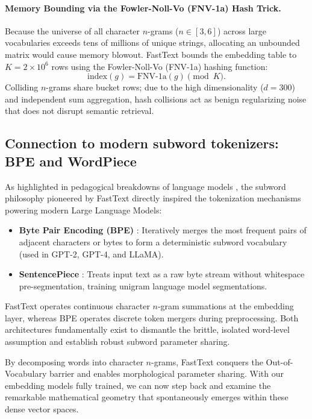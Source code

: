 \documentclass[../../main.tex]{subfiles}
\begin{document}
\paragraph{Memory Bounding via the Fowler-Noll-Vo (FNV-1a) Hash Trick.}
Because the universe of all character $n$-grams ($n \in [3, 6]$) across large vocabularies exceeds tens of millions of unique strings, allocating an unbounded matrix would cause memory blowout. FastText bounds the embedding table to $K = 2 \times 10^6$ rows using the Fowler-Noll-Vo (FNV-1a) hashing function:
\begin{equation}
\label{eq:fnv_hash}
\text{index}(g) = \text{FNV-1a}(g) \pmod K.
\end{equation}
Colliding $n$-grams share bucket rows; due to the high dimensionality ($d = 300$) and independent sum aggregation, hash collisions act as benign regularizing noise that does not disrupt semantic retrieval.

\subsection{Connection to modern subword tokenizers: BPE and WordPiece}
\label{subsec:subword_tokenizers_link}

As highlighted in pedagogical breakdowns of language models \cite{enkk2023embeddings}, the subword philosophy pioneered by FastText directly inspired the tokenization mechanisms powering modern Large Language Models:
\begin{itemize}
    \item \textbf{Byte Pair Encoding (BPE)} \cite{sennrich2016,radford2019}: Iteratively merges the most frequent pairs of adjacent characters or bytes to form a deterministic subword vocabulary (used in GPT-2, GPT-4, and LLaMA).
    \item \textbf{SentencePiece} \cite{kudo2018}: Treats input text as a raw byte stream without whitespace pre-segmentation, training unigram language model segmentations.
\end{itemize}
FastText operates continuous character $n$-gram summations at the embedding layer, whereas BPE operates discrete token mergers during preprocessing. Both architectures fundamentally exist to dismantle the brittle, isolated word-level assumption and establish robust subword parameter sharing.

By decomposing words into character $n$-grams, FastText conquers the Out-of-Vocabulary barrier and enables morphological parameter sharing. With our embedding models fully trained, we can now step back and examine the remarkable mathematical geometry that spontaneously emerges within these dense vector spaces.
\end{document}
